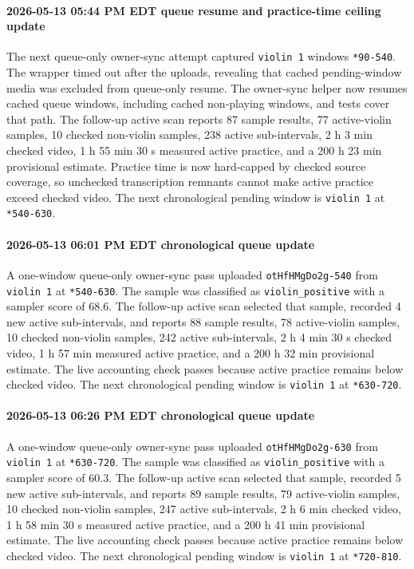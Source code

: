 \paragraph{2026-05-13 05:44 PM EDT queue resume and practice-time ceiling update} The next queue-only owner-sync attempt captured \texttt{violin 1} windows \texttt{*90-540}. The wrapper timed out after the uploads, revealing that cached pending-window media was excluded from queue-only resume. The owner-sync helper now resumes cached queue windows, including cached non-playing windows, and tests cover that path. The follow-up active scan reports 87 sample results, 77 active-violin samples, 10 checked non-violin samples, 238 active sub-intervals, 2 h 3 min checked video, 1 h 55 min 30 s measured active practice, and a 200 h 23 min provisional estimate. Practice time is now hard-capped by checked source coverage, so unchecked transcription remnants cannot make active practice exceed checked video. The next chronological pending window is \texttt{violin 1} at \texttt{*540-630}.
\paragraph{2026-05-13 06:01 PM EDT chronological queue update} A one-window queue-only owner-sync pass uploaded \texttt{otHfHMgDo2g-540} from \texttt{violin 1} at \texttt{*540-630}. The sample was classified as \texttt{violin\_positive} with a sampler score of 68.6. The follow-up active scan selected that sample, recorded 4 new active sub-intervals, and reports 88 sample results, 78 active-violin samples, 10 checked non-violin samples, 242 active sub-intervals, 2 h 4 min 30 s checked video, 1 h 57 min measured active practice, and a 200 h 32 min provisional estimate. The live accounting check passes because active practice remains below checked video. The next chronological pending window is \texttt{violin 1} at \texttt{*630-720}.
\paragraph{2026-05-13 06:26 PM EDT chronological queue update} A one-window queue-only owner-sync pass uploaded \texttt{otHfHMgDo2g-630} from \texttt{violin 1} at \texttt{*630-720}. The sample was classified as \texttt{violin\_positive} with a sampler score of 60.3. The follow-up active scan selected that sample, recorded 5 new active sub-intervals, and reports 89 sample results, 79 active-violin samples, 10 checked non-violin samples, 247 active sub-intervals, 2 h 6 min checked video, 1 h 58 min 30 s measured active practice, and a 200 h 41 min provisional estimate. The live accounting check passes because active practice remains below checked video. The next chronological pending window is \texttt{violin 1} at \texttt{*720-810}.
